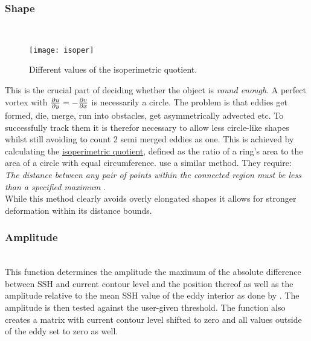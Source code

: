 \subsubsection{Shape}\label{filter:shape}
\\
\begin{wrapfigure}{r}{0.4\textwidth}
	\texttt{[image: isoper]}
	\caption{Different values of the isoperimetric quotient.}
	\label{fig:isoper}
\end{wrapfigure}
This is the crucial part of deciding whether the object is \textit{round
enough}. A perfect vortex with $\frac{\partial u}{\partial y}=-\frac{\partial v}{\partial x}$ is necessarily a
circle. The problem is that eddies get formed, die, merge, run into obstacles,
get asymmetrically advected etc. To successfully track them it is therefor
necessary to allow less circle-like shapes whilst still avoiding to \eg count 2
semi merged eddies as one. 
This is achieved by calculating the \hyperref[def:IQ]{isoperimetric quotient},
defined as the ratio of a ring's area to the area of a circle with equal
circumference. \cite{Chelton2011} use a similar method. They
require:\\ \textit{The distance between any pair of points within the connected
region must be less than a specified maximum} \citep{Chelton2011}.\\
While this method clearly avoids overly elongated shapes it allows for stronger
deformation within its distance bounds. 
\subsubsection{Amplitude} \label{filter:amp}
\\
This function determines the amplitude \ie the maximum of the absolute
difference between SSH and current contour level and the position thereof as
well as the amplitude relative to the mean SSH value of the eddy interior as
done by \cite{Chelton2011}. The
amplitude is then tested against the user-given threshold. The function also
creates a matrix with current contour level shifted to zero and all values
outside of the eddy set to zero as well. 
